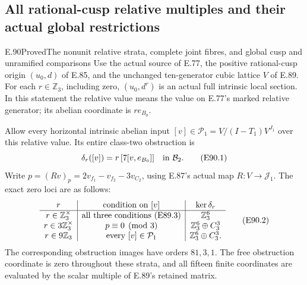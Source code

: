 \subsection{All rational-cusp relative multiples and their actual global restrictions}

\begin{statement}{E.90}{Proved}{The nonunit relative strata, complete joint fibres, and global cusp and unramified comparisons}
Use the actual source of E.77, the positive rational-cusp
origin $(u_0,d)$ of E.85, and the unchanged ten-generator
cubic lattice $V$ of E.89. For each $r\in\mathbb Z_3$,
including zero, $(u_0,d^r)$ is an actual full intrinsic
local section. In this statement the relative value
means the value on E.77's marked relative generator;
its abelian coordinate is $r e_{B_0}$.

Allow every horizontal intrinsic abelian input
$[v]\in\mathcal P_1=V/(I-T_1)V^{J_1}$ over this
relative value. Its entire class-two obstruction is
\[
       \delta_r([v])=r\,[7[v,e_{B_0}]]
          \quad\hbox{in }\mathcal B_2.
 \tag{E90.1}
\]
Write $p=(Rv)_p=2v_{f_1}-v_{f_2}-3v_{C_2}$,
using E.87's actual map $R:V\to\mathcal J_1$.
The exact zero loci are as follows:
\[
\begin{array}{c|c|c}
 r&\hbox{condition on }[v]&\ker\delta_r\\ \hline
 r\in\mathbb Z_3^\times&\text{all three conditions (E89.3)}
       &\mathbb Z_3^6\\
 r\in3\mathbb Z_3^\times&p\equiv0\pmod3
       &\mathbb Z_3^6\oplus C_3^3\\
 r\in9\mathbb Z_3&\text{every }[v]\in\mathcal P_1
       &\mathbb Z_3^6\oplus C_3^3.
\end{array}
 \tag{E90.2}
\]
The corresponding obstruction images have orders
$81,3,1$. The free obstruction coordinate is zero
throughout these strata, and all fifteen finite
coordinates are evaluated by the scalar multiple
of E.89's retained matrix.


\end{statement}
